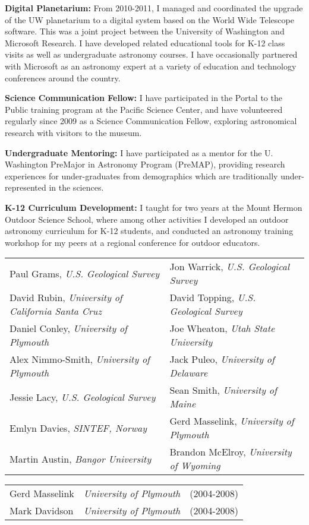 \listing
{\bf Digital Planetarium:} From 2010-2011, I managed and coordinated the upgrade of the UW planetarium to a digital system based on the World Wide Telescope software. This was a joint project between the University of Washington and Microsoft Research. I have developed related educational tools for K-12 class visits as well as undergraduate astronomy courses. I have occasionally partnered with Microsoft as an astronomy expert at a variety of education and technology conferences around the country.

\listing
{\bf Science Communication Fellow:} I have participated in the Portal to the Public training program at the Paciﬁc Science Center, and have volunteered regularly since 2009 as a Science Communication Fellow, exploring astronomical research with visitors to the museum.

\listing
{\bf Undergraduate Mentoring:} I have participated as a mentor for the U. Washington PreMajor in Astronomy Program (PreMAP), providing research experiences for under-graduates from demographics which are traditionally under-represented in the sciences.

\listing
{\bf K-12 Curriculum Development:} I taught for two years at the Mount Hermon Outdoor Science School, where among other activities I developed an outdoor astronomy curriculum for K-12 students, and conducted an astronomy training workshop for my peers at a regional conference for outdoor educators.


 \hskip -0.1in \begin{tabular}{ll}
Paul Grams, {\it U.S. Geological Survey} & Jon Warrick, {\it U.S. Geological Survey}\\
David Rubin, {\it University of California Santa Cruz} & David Topping, {\it U.S. Geological Survey}\\
Daniel Conley, {\it University of Plymouth} & Joe Wheaton, {\it Utah State University}\\
Alex Nimmo-Smith, {\it University of Plymouth} & Jack Puleo, {\it University of Delaware}\\
Jessie Lacy, {\it U.S. Geological Survey} & Sean Smith, {\it University of Maine}\\
Emlyn Davies, {\it SINTEF, Norway} & Gerd Masselink, {\it University of Plymouth}\\
Martin Austin, {\it Bangor University} & Brandon McElroy, {\it University of Wyoming}\\
\end{tabular}


\hskip -0.1in \begin{tabular}{lll}
  Gerd Masselink & {\it University of Plymouth} & (2004-2008)\\
  Mark Davidson & {\it University of Plymouth} & (2004-2008)\\
\end{tabular}


